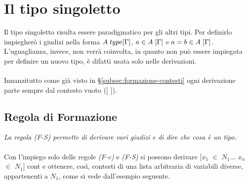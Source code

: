 \section{Il tipo singoletto}
\label{sec:tipo-singoletto}
Il tipo singoletto risulta essere paradigmatico per gli altri tipi. Per definirlo impiegher\`o i giudizi nella forma $A\hspace{0.1cm}type[\Gamma]$, $a \in A\hspace{0.1cm}[\Gamma]$ e $a = b \in A\hspace{0.1cm}[\Gamma]$. L'uguaglianza, invece, non verr\`a coinvolta, in quanto non pu\`o essere impiegata per definire un nuovo tipo, \`e difatti usata solo nelle derivazioni.\\\\
Innanzitutto come gi\`a visto in \S\ref{subsec:formazione-contesti} ogni derivazione parte sempre dal contesto vuoto ([ ]).
\begin{prooftree}
\end{prooftree}

\subsection{Regola di Formazione}
\label{subsec:formazione-singoletto}
\begin{prooftree}
\end{prooftree}
\textit{La regola (F-S) permette di derivare vari giudizi e di dire che cosa \`e un tipo.}\\\\
Con l'impiego solo delle regole \textit{(F-c)} e \textit{(F-S)} si possono derivare [$x_1$ $\in$ $N_1$... $x_n$ $\in$ $N_1$] cont e ottenere, cos\`i, contesti di una lista arbitraria di variabili diverse, appartenenti a $N_1$, come si vede dall'esempio seguente.
\begin{prooftree}
\end{prooftree}

